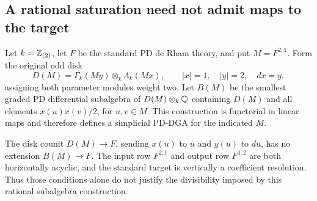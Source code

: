 \subsection{A rational saturation need not admit maps to the target}

\begin{proposition}
\label{sa08:C35}
Let $k=\mathbb Z_{(2)}$, let $F$ be the standard PD de Rham theory,
and put $M=F^{2,1}$. Form the original odd disk
\[
 D(M)=\Gamma_k(My)\otimes_k\Lambda_k(Mx),\qquad
 |x|=1,\quad |y|=2,\quad dx=y,
\]
assigning both parameter modules weight two. Let $B(M)$ be the
smallest graded PD differential subalgebra of $D(M)\otimes_k\mathbb Q$
containing $D(M)$ and all elements $x(u)x(v)/2$, for $u,v\in M$.
This construction is functorial in linear maps and therefore defines
a simplicial PD-DGA for the indicated $M$.

The disk counit $D(M)\to F$, sending $x(u)$ to $u$ and $y(u)$
to $du$, has no extension $B(M)\to F$. The input row $F^{2,1}$
and output row $F^{4,2}$ are both horizontally acyclic, and the
standard target is vertically a coefficient resolution. Thus those
conditions alone do not justify the divisibility imposed by this
rational subalgebra construction.
\end{proposition}
